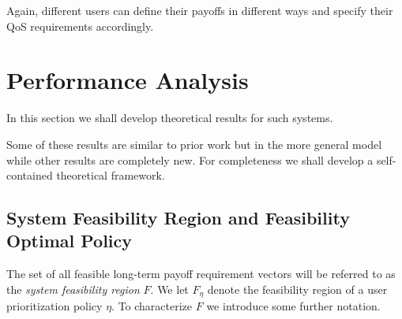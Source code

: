 \documentclass[prodmode,acmtompecs]{acmsmall}
\newcommand{\reqscalar}{q}
\newcommand{\feasibilityRegion}{F}
\newcommand{\fullUserSet}{N}
\newcommand{\myComments}[1]{}
\newif\ifinfocom
\newif\ifdissertation
\newcommand{\infocomStart}{\ifinfocom \myComments{Infocom: }}
\newcommand{\dissertationStart}{\ifdissertation  \myComments{Dissertation version: }}
\newcommand{\commentEnd}{\myComments{End}}
\begin{document}
Again, different users can define their payoffs in different ways and specify their QoS requirements accordingly. 

\dissertationStart
\myComments{In dissertaion, we have to re-organize this section. }
\subsection{Other Interpretations of General Payoff Model}
Our general payoff model applies beyond the soft real-time context. For example, for each user $i\in \fullUserSet$, by viewing $\reqscalar_i$ as expected arrival rates and $V_i(\mathbf{d}(t+1))$ as the service rate given priority decision $\mathbf{d}(t+1)$ is selected in period $t+1$, the general payoff model captures the queueing system, e.g., the generalized switch model or the wireless networks considered in prior work \cite{DiW06,JLS07,KWJ13}. 

However, our general payoff model is general in the sense that the ``impact'' of priority decisions $\mathbf{d} \in D$ on the payoff vectors $P$ is left unspecified, while the interference model in these prior work implicitly imply properties on P. 

In the next section, we first derive results in the general payoff model and then add further properties on $P$ to get cleaner results. 
\commentEnd\fi


\section{Performance Analysis}

In this section we shall develop theoretical results for such systems. 
\infocomStart
To save space we have deferred proofs of these results to the extended version of this paper available at \cite{EXT2}. 
\commentEnd\fi
Some of these results are similar to prior work but in the more general model while other results are completely new. 
For completeness we shall develop a self-contained theoretical framework. 
\dissertationStart
In the sequel we provide examples to help understand these results in the context of SRT applications. 
\commentEnd\fi

\subsection{System Feasibility Region and Feasibility Optimal Policy}
\label{subsection_feasibility_region_and_optimal_scheduling}

The set of all feasible long-term payoff requirement vectors will be referred to as the {\em system feasibility region} $\feasibilityRegion$. 
We let $\feasibilityRegion_\eta$ denote the feasibility region of a user prioritization policy $\eta$. 
To characterize $\feasibilityRegion$ we introduce some further notation. 
\end{document}

